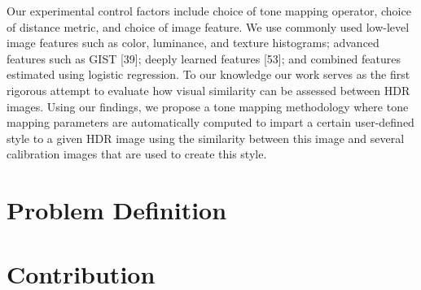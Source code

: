 Our experimental control factors include choice of tone mapping operator, choice of distance metric, and choice of image feature. We use commonly used low-level image features such as color, luminance, and texture histograms; advanced features such as GIST [39]; deeply learned features [53]; and combined features estimated using logistic regression. To our knowledge our work serves as the first rigorous attempt to evaluate how visual similarity can be assessed between HDR images. Using our findings, we propose a tone mapping methodology where tone mapping parameters are automatically computed to impart a certain user-defined style to a given HDR image using the similarity between this image and several calibration images that are used to create this style.
\section{ Problem Definition}


\section{Contribution}







